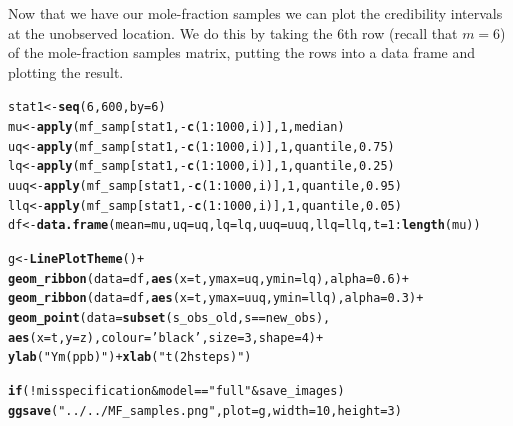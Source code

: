 \documentclass[a4paper,11pt]{article}\usepackage[]{graphicx}\usepackage[]{color}
\makeatletter
\newcommand{\hlnum}[1]{\textcolor[rgb]{0.686,0.059,0.569}{#1}}%
\newcommand{\hlstr}[1]{\textcolor[rgb]{0.192,0.494,0.8}{#1}}%
\newcommand{\hlopt}[1]{\textcolor[rgb]{0,0,0}{#1}}%
\newcommand{\hlstd}[1]{\textcolor[rgb]{0.345,0.345,0.345}{#1}}%
\newcommand{\hlkwa}[1]{\textcolor[rgb]{0.161,0.373,0.58}{\textbf{#1}}}%
\newcommand{\hlkwb}[1]{\textcolor[rgb]{0.69,0.353,0.396}{#1}}%
\newcommand{\hlkwc}[1]{\textcolor[rgb]{0.333,0.667,0.333}{#1}}%
\newcommand{\hlkwd}[1]{\textcolor[rgb]{0.737,0.353,0.396}{\textbf{#1}}}%
\newenvironment{kframe}{%
 \def\at@end@of@kframe{}%
 \ifinner\ifhmode%
  \def\at@end@of@kframe{\end{minipage}}%
  \begin{minipage}{\columnwidth}%
 \fi\fi%
 \def\FrameCommand##1{\hskip\@totalleftmargin \hskip-\fboxsep
 \colorbox{shadecolor}{##1}\hskip-\fboxsep
     \hskip-\linewidth \hskip-\@totalleftmargin \hskip\columnwidth}%
 \MakeFramed {\advance\hsize-\width
   \@totalleftmargin\z@ \linewidth\hsize
   \@setminipage}}%
 {\par\unskip\endMakeFramed%
 \at@end@of@kframe}
\newenvironment{knitrout}{}{} %
\makeatother
\begin{document}
Now that we have our mole-fraction samples we can plot the credibility intervals at the unobserved location. We do this by taking the 6th row (recall that $m = 6$) of the mole-fraction samples matrix, putting the rows into a data frame and plotting the result.
\begin{knitrout}
\color{fgcolor}\begin{kframe}
\begin{alltt}
\hlstd{stat1} \hlkwb{<-}  \hlkwd{seq}\hlstd{(}\hlnum{6}\hlstd{,}\hlnum{600}\hlstd{,}\hlkwc{by}\hlstd{=}\hlnum{6}\hlstd{)}
\hlstd{mu} \hlkwb{<-} \hlkwd{apply}\hlstd{(mf_samp[stat1,}\hlopt{-}\hlkwd{c}\hlstd{(}\hlnum{1}\hlopt{:}\hlnum{1000}\hlstd{,i)],}\hlnum{1}\hlstd{,median)}
\hlstd{uq} \hlkwb{<-} \hlkwd{apply}\hlstd{(mf_samp[stat1,}\hlopt{-}\hlkwd{c}\hlstd{(}\hlnum{1}\hlopt{:}\hlnum{1000}\hlstd{,i)],}\hlnum{1}\hlstd{,quantile,}\hlnum{0.75}\hlstd{)}
\hlstd{lq} \hlkwb{<-} \hlkwd{apply}\hlstd{(mf_samp[stat1,}\hlopt{-}\hlkwd{c}\hlstd{(}\hlnum{1}\hlopt{:}\hlnum{1000}\hlstd{,i)],}\hlnum{1}\hlstd{,quantile,}\hlnum{0.25}\hlstd{)}
\hlstd{uuq} \hlkwb{<-} \hlkwd{apply}\hlstd{(mf_samp[stat1,}\hlopt{-}\hlkwd{c}\hlstd{(}\hlnum{1}\hlopt{:}\hlnum{1000}\hlstd{,i)],}\hlnum{1}\hlstd{,quantile,}\hlnum{0.95}\hlstd{)}
\hlstd{llq} \hlkwb{<-} \hlkwd{apply}\hlstd{(mf_samp[stat1,}\hlopt{-}\hlkwd{c}\hlstd{(}\hlnum{1}\hlopt{:}\hlnum{1000}\hlstd{,i)],}\hlnum{1}\hlstd{,quantile,}\hlnum{0.05}\hlstd{)}
\hlstd{df} \hlkwb{<-} \hlkwd{data.frame}\hlstd{(}\hlkwc{mean} \hlstd{= mu,} \hlkwc{uq}\hlstd{=uq,}\hlkwc{lq}\hlstd{=lq,}\hlkwc{uuq}\hlstd{=uuq,}\hlkwc{llq}\hlstd{=llq,}\hlkwc{t}\hlstd{=}\hlnum{1}\hlopt{:}\hlkwd{length}\hlstd{(mu))}

\hlstd{g} \hlkwb{<-} \hlkwd{LinePlotTheme}\hlstd{()} \hlopt{+}
  \hlkwd{geom_ribbon}\hlstd{(}\hlkwc{data}\hlstd{=df,}\hlkwd{aes}\hlstd{(}\hlkwc{x}\hlstd{=t,}\hlkwc{ymax}\hlstd{=uq,}\hlkwc{ymin}\hlstd{=lq),}\hlkwc{alpha}\hlstd{=}\hlnum{0.6}\hlstd{)} \hlopt{+}
  \hlkwd{geom_ribbon}\hlstd{(}\hlkwc{data}\hlstd{=df,}\hlkwd{aes}\hlstd{(}\hlkwc{x}\hlstd{=t,}\hlkwc{ymax}\hlstd{=uuq,}\hlkwc{ymin}\hlstd{=llq),}\hlkwc{alpha}\hlstd{=}\hlnum{0.3}\hlstd{)} \hlopt{+}
  \hlkwd{geom_point}\hlstd{(}\hlkwc{data}\hlstd{=}\hlkwd{subset}\hlstd{(s_obs_old,s}\hlopt{==}\hlstd{new_obs),}
             \hlkwd{aes}\hlstd{(}\hlkwc{x}\hlstd{=t,}\hlkwc{y} \hlstd{= z),}\hlkwc{colour}\hlstd{=}\hlstr{'black'}\hlstd{,}\hlkwc{size}\hlstd{=}\hlnum{3}\hlstd{,}\hlkwc{shape}\hlstd{=}\hlnum{4}\hlstd{)}\hlopt{+}
    \hlkwd{ylab}\hlstd{(}\hlstr{"Ym (ppb)"}\hlstd{)} \hlopt{+} \hlkwd{xlab}\hlstd{(}\hlstr{"t (2 h steps)"}\hlstd{)}

\hlkwa{if}\hlstd{(}\hlopt{!}\hlstd{misspecification} \hlopt{&} \hlstd{model}\hlopt{==}\hlstr{"full"} \hlopt{&} \hlstd{save_images)}
  \hlkwd{ggsave}\hlstd{(}\hlstr{"../../MF_samples.png"}\hlstd{,}\hlkwc{plot} \hlstd{= g,}\hlkwc{width}\hlstd{=}\hlnum{10}\hlstd{,}\hlkwc{height}\hlstd{=}\hlnum{3}\hlstd{)}
\end{alltt}
\end{kframe}
\end{knitrout}
\end{document}
